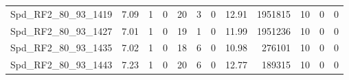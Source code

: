 \begin{longtable}[c]{@{}lrrrrrrrrrrr@{}}
Spd\_RF2\_80\_93\_1419        & 7.09                   & 1                       & 0                       & 20                     & 3                       & 0                       & 12.91                   & 1951815                  & 10                       & 0                        & 0                        \\
Spd\_RF2\_80\_93\_1427        & 7.01                   & 1                       & 0                       & 19                     & 1                       & 0                       & 11.99                   & 1951236                  & 10                       & 0                        & 0                        \\
Spd\_RF2\_80\_93\_1435        & 7.02                   & 1                       & 0                       & 18                     & 6                       & 0                       & 10.98                   & 276101                   & 10                       & 0                        & 0                        \\
Spd\_RF2\_80\_93\_1443        & 7.23                   & 1                       & 0                       & 20                     & 6                       & 0                       & 12.77                   & 189315                   & 10                       & 0                        & 0                        \\* \bottomrule
\end{longtable}